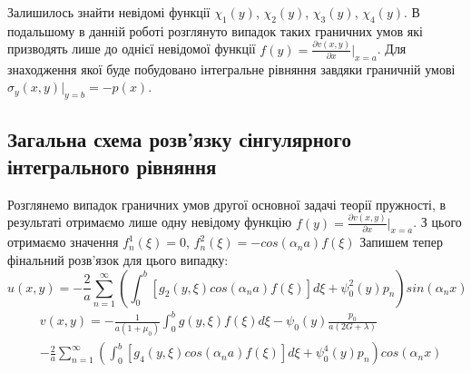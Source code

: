 Залишилось знайти невідомі функції $\chi_1(y)$, $\chi_2(y)$, $\chi_3(y)$, $\chi_4(y)$.
В подальшому в данній роботі розглянуто випадок таких граничних умов які призводять лише до однієї невідомої функції $f(y) = \frac{\partial v(x,y)}{\partial x}|_{x=a}$.
Для знаходження якої буде побудовано інтегральне рівняння завдяки граничній умові $\sigma_y(x, y) |_{y=b} = -p(x)$.

\subsection{Загальна схема розв'язку сінгулярного інтегрального рівняння}
Розглянемо випадок граничних умов другої основної задачі теорії пружності, в результаті отримаємо лише одну невідому функцію $f(y) = \frac{\partial v(x,y)}{\partial x}|_{x=a}$.
З цього отримаємо значення $f_n^1(\xi) = 0$, $f_n^2(\xi)= -cos(\alpha_n a) f(\xi) $
Запишем тепер фінальний розв'язок для цього випадку:
\begin{equation}
    u(x,y) = -\frac{2}{a} \sum_{n=1}^{\infty} \left( \int_0^b \left[g_2(y, \xi)cos(\alpha_n a) f(\xi) \right]d\xi + \psi_0^2(y) p_n \right) sin(\alpha_n x)
\end{equation}
\begin{align}
    &v(x,y) = -\frac{1}{a(1+\mu_0)} \int_{0}^{b}g(y,\xi) f(\xi) d\xi - \psi_0(y) \frac{p_0}{a(2G + \lambda)} \nonumber \\
    &- \frac{2}{a} \sum_{n=1}^{\infty} \left( \int_0^b \left[g_4(y, \xi) cos(\alpha_n a) f(\xi) \right]d\xi + \psi_0^4(y) p_n  \right) cos(\alpha_n x)
\end{align}

